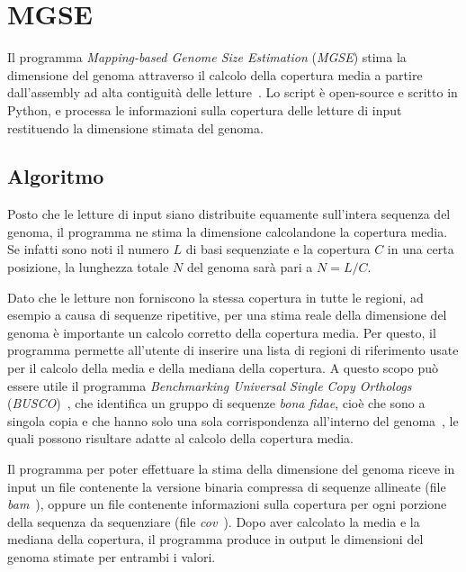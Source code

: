 \documentclass[crop=false, class=book]{standalone}
\begin{document}
	\section{MGSE}
	\label{sec:MGSE}
	Il programma \textit{Mapping-based Genome Size Estimation} (\textit{MGSE}) stima la dimensione del genoma attraverso il calcolo della copertura media a partire dall'assembly ad alta contiguità delle letture~\cite{pucker2019MGSE}. Lo script è open-source e scritto in Python, e processa le informazioni sulla copertura delle letture di input restituendo la dimensione stimata del genoma.
	
	\subsection{Algoritmo}
	Posto che le letture di input siano distribuite equamente sull'intera sequenza del genoma, il programma ne stima la dimensione calcolandone la copertura media. Se infatti sono noti il numero $L$ di basi sequenziate e la copertura $C$ in una certa posizione, la lunghezza totale $N$ del genoma sarà pari a $N = L/C$.
	
	Dato che le letture non forniscono la stessa copertura in tutte le regioni, ad esempio a causa di sequenze ripetitive, per una stima reale della dimensione del genoma è importante un calcolo corretto della copertura media. Per questo, il programma permette all'utente di inserire una lista di regioni di riferimento usate per il calcolo della media e della mediana della copertura. A questo scopo può essere utile il programma \textit{Benchmarking Universal Single Copy Orthologs} (\textit{BUSCO})~\cite{simao2015busco}, che identifica un gruppo di sequenze \textit{bona fidae}, cioè che sono a singola copia e che hanno solo una sola corrispondenza all'interno del genoma~\cite{li2005trumatch}, le quali possono risultare adatte al calcolo della copertura media. 
	
	Il programma per poter effettuare la stima della dimensione del genoma riceve in input un file contenente la versione binaria compressa di sequenze allineate (file \textit{bam}~\cite{li2009sequence}), oppure un file contenente informazioni sulla copertura per ogni porzione della sequenza da sequenziare (file \textit{cov}~\cite{pucker2018genome}). Dopo aver calcolato la media e la mediana della copertura, il programma produce in output le dimensioni del genoma stimate per entrambi i valori.
	
\end{document}
